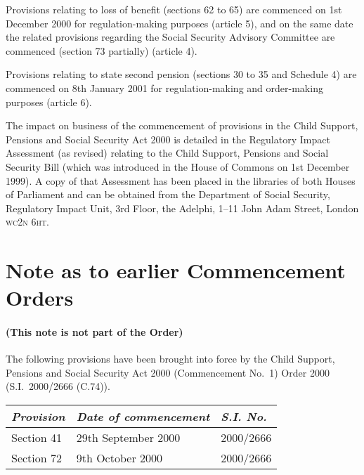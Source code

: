 \documentclass[12pt,a4paper]{article}
\begin{document}
Provisions relating to loss of benefit (sections 62 to 65) are commenced on 1st December 2000 for regulation-making purposes (article 5), and on the same date the related provisions regarding the Social Security Advisory Committee are commenced (section 73 partially) (article 4).

Provisions relating to state second pension (sections 30 to 35 and Schedule 4) are commenced on 8th January 2001 for regulation-making and order-making purposes (article 6).

The impact on business of the commencement of provisions in the Child Support, Pensions and Social Security Act 2000 is detailed in the Regulatory Impact Assessment (as revised) relating to the Child Support, Pensions and Social Security Bill (which was introduced in the House of Commons on 1st December 1999). A copy of that Assessment has been placed in the libraries of both Houses of Parliament and can be obtained from the Department of Social Security, Regulatory Impact Unit, 3rd Floor, the Adelphi, 1--11 John Adam Street, London \textsc{\lowercase{WC2N 6HT}}.  

\part{Note as to earlier Commencement Orders}

\renewcommand\parthead{--- Note as to earlier Commencement Orders}

\subsection*{(This note is not part of the Order)}

The following provisions have been brought into force by the Child Support, Pensions and Social Security Act 2000 (Commencement No.\ 1) Order 2000 (S.I.\ 2000/2666 (C.74)).

{\footnotesize\noindent
\begin{longtable}{lll}
\hline
\itshape Provision	&\itshape Date of commencement	&\itshape S.I. No.\\
\hline
\endhead
\hline
\endlastfoot
Section 41	&29th September 2000	&2000/2666\\
Section 72	&9th October 2000	&2000/2666\\
\end{longtable}

}
\end{document}

